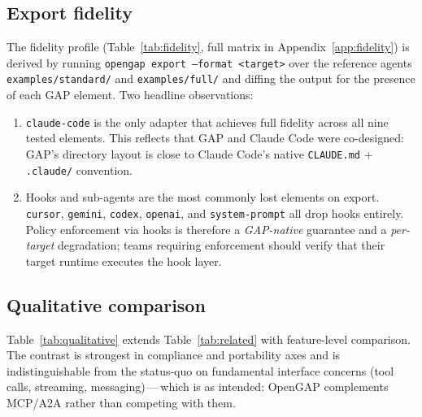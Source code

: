 \documentclass[11pt,a4paper]{article}
\begin{document}
\subsection{Export fidelity}

The fidelity profile (Table~\ref{tab:fidelity}, full matrix in
Appendix~\ref{app:fidelity}) is derived by running
\texttt{opengap export --format <target>} over the reference agents
\texttt{examples/standard/} and \texttt{examples/full/} and diffing the output for the
presence of each GAP element. Two headline observations:

\begin{enumerate}
  \item \texttt{claude-code} is the only adapter that achieves full fidelity across
  all nine tested elements. This reflects that GAP and Claude Code were co-designed:
  GAP's directory layout is close to Claude Code's native \texttt{CLAUDE.md} +
  \texttt{.claude/} convention.
  \item Hooks and sub-agents are the most commonly lost elements on export.
  \texttt{cursor}, \texttt{gemini}, \texttt{codex}, \texttt{openai}, and
  \texttt{system-prompt} all drop hooks entirely. Policy enforcement via hooks is
  therefore a \emph{GAP-native} guarantee and a \emph{per-target} degradation; teams
  requiring enforcement should verify that their target runtime executes the hook
  layer.
\end{enumerate}

\subsection{Qualitative comparison}

Table~\ref{tab:qualitative} extends Table~\ref{tab:related} with feature-level
comparison. The contrast is strongest in compliance and portability axes and is
indistinguishable from the status-quo on fundamental interface concerns (tool calls,
streaming, messaging)\,---\,which is as intended: OpenGAP complements MCP/A2A rather
than competing with them.
\end{document}
